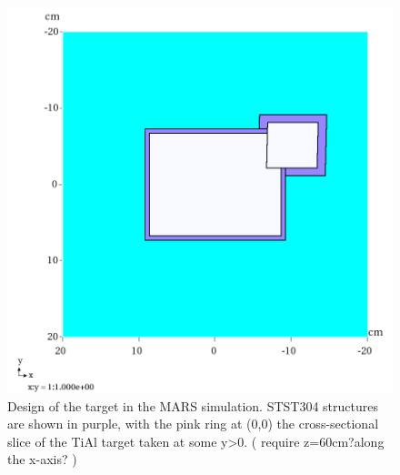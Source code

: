 \documentclass[a4paper,11pt]{article}
\begin{document}
\begin{figure}[t!]
  \begin{center}
    \includegraphics[width=1.0\columnwidth]{./figures/XYGeom-v6-Q1-z=22cm.png}
    \caption{Design of the target in the MARS simulation. STST304 structures are shown in purple, with the pink ring at (0,0) the cross-sectional slice of the TiAl target taken at some y>0. ( require z=60cm?along the x-axis? ) }
    \label{fig:MARSXY}
  \end{center}
\end{figure}
\end{document}
